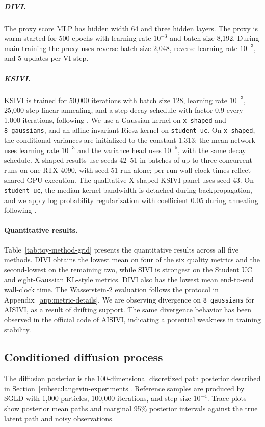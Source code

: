 \subparagraph{DIVI.}
The proxy score MLP has hidden width 64 and three hidden layers.  The proxy is warm-started for 500 epochs with learning rate $10^{-3}$ and batch size 8,192.  During main training the proxy uses reverse batch size 2,048, reverse learning rate $10^{-3}$, and 5 updates per VI step.

\subparagraph{KSIVI.}
KSIVI is trained for 50,000 iterations with batch size 128, learning rate $10^{-3}$, 25,000-step linear annealing, and a step-decay schedule with factor 0.9 every 1,000 iterations, following \citet{cheng2024kernel}. We use a Gaussian kernel on \texttt{x\_shaped} and \texttt{8\_gaussians}, and an affine-invariant Riesz kernel on \texttt{student\_uc}. On \texttt{x\_shaped}, the conditional variances are initialized to the constant $1.313$; the mean network uses learning rate $10^{-3}$ and the variance head uses $10^{-5}$, with the same decay schedule. X-shaped results use seeds 42--51 in batches of up to three concurrent runs on one RTX 4090, with seed 51 run alone; per-run wall-clock times reflect shared-GPU execution. The qualitative X-shaped KSIVI panel uses seed 43. On \texttt{student\_uc}, the median kernel bandwidth is detached during backpropagation, and we apply log probability regularization with coefficient $0.05$ during annealing following \citet{cheng2024kernel}.

\paragraph{Quantitative results.}
Table~\ref{tab:toy-method-grid} presents the quantitative results across all five methods. DIVI obtains the lowest mean on four of the six quality metrics and the second-lowest on the remaining two, while SIVI is strongest on the Student UC and eight-Gaussian KL-style metrics. DIVI also has the lowest mean end-to-end wall-clock time. The Wasserstein-2 evaluation follows the protocol in Appendix~\ref{app:metric-details}. We are observing divergence on \texttt{8_gaussians} for AISIVI, as a result of drifting support. The same divergence behavior has been observed in the official code of AISIVI, indicating a potential weakness in training stability.

\subsection{Conditioned diffusion process}
\label{app:diffusion-details}

The diffusion posterior is the 100-dimensional discretized path posterior described in Section~\ref{subsec:langevin-experiments}.  Reference samples are produced by SGLD with 1,000 particles, 100,000 iterations, and step size $10^{-4}$.  Trace plots show posterior mean paths and marginal 95\% posterior intervals against the true latent path and noisy observations.

